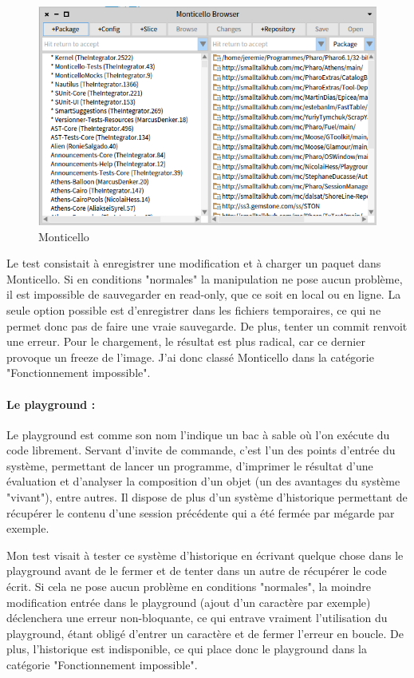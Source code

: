 \begin{figure}[h]
	\includegraphics[width=\linewidth]{./img/monticello.png}
	\caption[monticello]{Monticello}
\end{figure}

Le test consistait à enregistrer une modification et à charger un paquet dans Monticello. Si en conditions "normales" la manipulation ne pose aucun problème, il est impossible de sauvegarder en read-only, que ce soit en local ou en ligne. La seule option possible est d'enregistrer dans les fichiers temporaires, ce qui ne permet donc pas de faire une vraie sauvegarde. De plus, tenter un commit renvoit une erreur. Pour le chargement, le résultat est plus radical, car ce dernier provoque un freeze de l'image. J'ai donc classé Monticello dans la catégorie "Fonctionnement impossible".

\paragraph{Le playground :}
Le playground est comme son nom l'indique un bac à sable où l'on exécute du code librement. Servant d'invite de commande, c'est l'un des points d'entrée du système, permettant de lancer un programme, d'imprimer le résultat d'une évaluation et d'analyser la composition d'un objet (un des avantages du système "vivant"), entre autres. Il dispose de plus d'un système d'historique permettant de récupérer le contenu d'une session précédente qui a été fermée par mégarde par exemple.



Mon test visait à tester ce système d'historique en écrivant quelque chose dans le playground avant de le fermer et de tenter dans un autre de récupérer le code écrit. Si cela ne pose aucun problème en conditions "normales", la moindre modification entrée dans le playground (ajout d'un caractère par exemple) déclenchera une erreur non-bloquante, ce qui entrave vraiment l'utilisation du playground, étant obligé d'entrer un caractère et de fermer l'erreur en boucle. De plus, l'historique est indisponible, ce qui place donc le playground dans la catégorie "Fonctionnement impossible".

